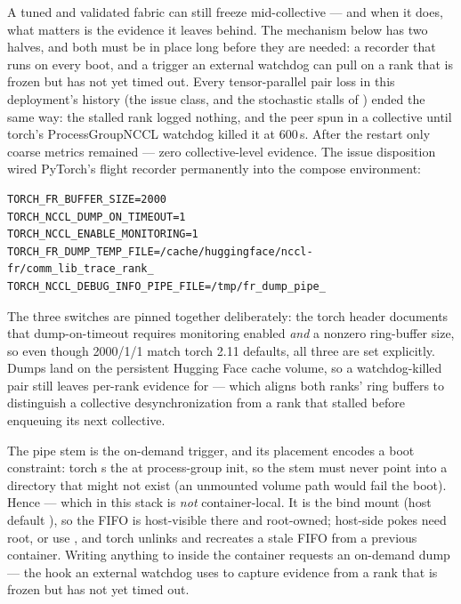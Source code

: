 A tuned and validated fabric can still freeze mid-collective --- and when it
does, what matters is the evidence it leaves behind. The mechanism below has
two halves, and both must be in place long before they are needed: a
recorder that runs on every boot, and a trigger an external watchdog can
pull on a rank that is frozen but has not yet timed out. Every tensor-parallel
pair loss in this deployment's history (the issue
 class, and the stochastic  stalls of
) ended the same way: the stalled rank logged nothing, and the
peer spun in a collective until torch's ProcessGroupNCCL watchdog killed it
at 600\,s. After the restart only coarse metrics remained --- zero
collective-level evidence. The issue  disposition wired
PyTorch's flight recorder permanently into the compose environment:

\begin{lstlisting}
TORCH_FR_BUFFER_SIZE=2000
TORCH_NCCL_DUMP_ON_TIMEOUT=1
TORCH_NCCL_ENABLE_MONITORING=1
TORCH_FR_DUMP_TEMP_FILE=/cache/huggingface/nccl-fr/comm_lib_trace_rank_
TORCH_NCCL_DEBUG_INFO_PIPE_FILE=/tmp/fr_dump_pipe_
\end{lstlisting}

The three switches are pinned together deliberately: the torch header
documents that dump-on-timeout requires monitoring enabled \emph{and} a
nonzero ring-buffer size, so even though 2000/1/1 match torch 2.11 defaults,
all three are set explicitly. Dumps land on the persistent Hugging Face
cache volume, so a watchdog-killed pair still leaves per-rank evidence for
 --- which aligns both ranks' ring buffers to distinguish
a collective desynchronization from a rank that stalled before enqueuing its
next collective.

The pipe stem is the on-demand trigger, and its placement encodes a boot
constraint: torch s the  at process-group
init, so the stem must never point into a directory that might not exist
(an unmounted volume path would fail the boot). Hence  ---
which in this stack is \emph{not} container-local. It is the
 bind mount (host default
), so the FIFO is host-visible there and
root-owned; host-side pokes need root, or use , and torch
unlinks and recreates a stale FIFO from a previous container. Writing
anything to  inside the container
requests an on-demand dump --- the hook an external watchdog uses to capture
evidence from a rank that is frozen but has not yet timed out.

